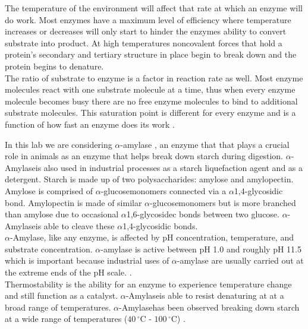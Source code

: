 \documentclass{article}
\begin{document}
The temperature of the environment will affect that rate at which an enzyme will do work. Most enzymes
have a maximum level of efficiency where temperature increases or decreases will only start to hinder
the enzymes ability to convert substrate into product. At high temperatures noncovalent forces
that hold a protein's secondary and tertiary structure in place begin to break down and the protein
begins to denature. \\

The ratio of substrate to enzyme is a factor in reaction rate as well. Most enzyme molecules react with one
substrate molecule at a time, thus when every enzyme molecule becomes busy there are no free enzyme
molecules to bind to additional substrate molecules. This saturation point is different for every
enzyme and is a function of how fast an enzyme does its work \cite{worthington}. \\


\newcommand{\aamylase}{$\alpha$-amylase }
\newcommand{\aamylasens}{$\alpha$-amylase}
\newcommand{\Aamylase}{$\alpha$-Amylase}
\newcommand{\onefour}{$\alpha$1,4}
\newcommand{\onesix}{$\alpha$1,6}
\newcommand{\aglucose}{$\alpha$-glucose}
\newcommand{\degreesC}[1]{$#1\,^{\circ}\mathrm{C}$}

In this lab we are considering \aamylase, an enzyme that that plays a crucial role in animals as an
enzyme that helps break down starch during digestion. \Aamylase is also used in industrial processes
as a starch liquefaction agent and as a detergent. Starch is made up of two polysaccharides:
amylose and amylopectin. Amylose is comprised of \aglucose monomers connected via a
\onefour-glycosidic bond. Amylopectin is made of similar \aglucose monomers but is more branched
than amylose due to occasional \onesix-glycosidec bonds between two glucose. \Aamylase is able to
cleave these \onefour-glycosidic bonds. \\

\Aamylase, like any enzyme, is affected by pH concentration, temperature, and substrate
concentration. \aamylase is active between pH 1.0 and roughly pH 11.5 which is important because
industrial uses of \aamylase are usually carried out at the extreme ends of the pH scale.
\cite{Nielsen}. \\

Thermostability is the ability for an enzyme to experience temperature change and still function as a
catalyst. \Aamylase is able to resist denaturing at at a broad range of temperatures. \Aamylase has
been observed breaking down starch at a wide range of temperatures (\degreesC{40} - \degreesC{100})
\cite{fitter}. \\
\end{document}
